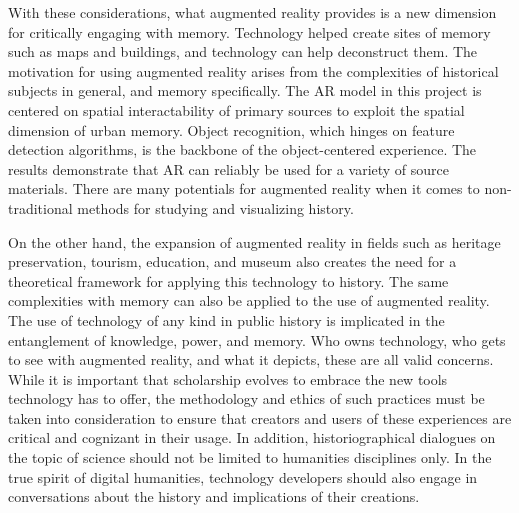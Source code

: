 With these considerations, what augmented reality provides is a new dimension for critically engaging with memory. Technology helped create sites of memory such as maps and buildings, and technology can help deconstruct them. The motivation for using augmented reality arises from the complexities of historical subjects in general, and memory specifically. The AR model in this project is centered on spatial interactability of primary sources to exploit the spatial dimension of urban memory. Object recognition, which hinges on feature detection algorithms, is the backbone of the object-centered experience. The results demonstrate that AR can reliably be used for a variety of source materials. There are many potentials for augmented reality when it comes to non-traditional methods for studying and visualizing history.

On the other hand, the expansion of augmented reality in fields such as heritage preservation, tourism, education, and museum also creates the need for a theoretical framework for applying this technology to history. The same complexities with memory can also be applied to the use of augmented reality. The use of technology of any kind in public history is implicated in the entanglement of knowledge, power, and memory. Who owns technology, who gets to see with augmented reality, and what it depicts, these are all valid concerns. While it is important that scholarship evolves to embrace the new tools technology has to offer, the methodology and ethics of such practices must be taken into consideration to ensure that creators and users of these experiences are critical and cognizant in their usage. In addition, historiographical dialogues on the topic of science should not be limited to humanities disciplines only. In the true spirit of digital humanities, technology developers should also engage in conversations about the history and implications of their creations.